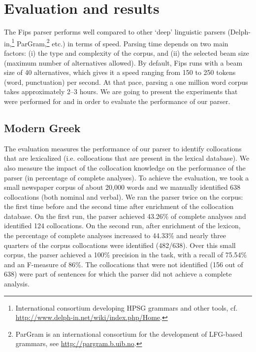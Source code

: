\documentclass[output=paper]{langsci/langscibook}
\begin{document}
\section{Evaluation and results}
\label{fou:sec6}
The Fips parser performs well compared to other `deep' linguistic parsers (Delph-in,\footnote{International consortium developing HPSG grammars and other tools, cf. \url{http://www.delph-in.net/wiki/index.php/Home}.} ParGram,\footnote{ParGram is an international consortium for the development of LFG-based grammars, see \url{http://pargram.b.uib.no}.} etc.) in terms of speed. Parsing time depends on two main factors: (i) the type and complexity of the corpus, and (ii) the selected beam size (maximum number of alternatives allowed). By default, Fips runs with a beam size of 40 alternatives, which gives it a speed ranging from 150 to 250 tokens (word, punctuation) per second. At that pace, parsing a one million word corpus takes approximately 2--3 hours. We are going to present the experiments that were performed for  and  in order to evaluate the performance of our parser. 

\subsection{Modern Greek}
The evaluation measures the performance of our parser to identify collocations that are lexicalized (i.e. collocations that are present in the lexical database). We also measure the impact of the collocation knowledge on the performance of the parser (in percentage of complete analyses). To achieve the evaluation, we took a small newspaper corpus of about 20,000 words  and we manually identified 638 collocations (both nominal and verbal). We ran the parser twice on the corpus: the first time before and the second time after enrichment of the collocation database. 
On the first run, the parser achieved 43.26\% of complete analyses and identified 124 collocations. On the second run, after enrichment of the lexicon, the percentage of complete analyses increased to 44.33\% and nearly three quarters of the corpus collocations were identified (482/638). Over this small corpus, the parser achieved a 100\% precision in the  task, with a recall of 75.54\% and an F-measure of 86\%. The collocations that were not identified (156 out of 638) were part of sentences for which the parser did not achieve a complete analysis.
	
\end{document}
